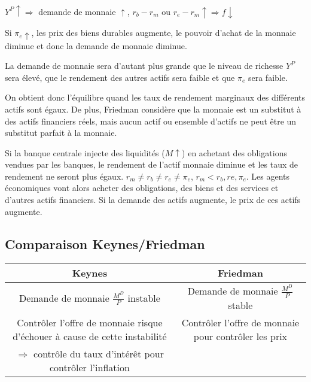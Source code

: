 	$Y^P \uparrow \Rightarrow$ demande de monnaie $\uparrow$, $r_b - r_m$ ou $r_e - r_m \uparrow \Rightarrow f \downarrow$
	
	Si $\pi_e \uparrow$, les prix des biens durables augmente, le pouvoir d'achat de la monnaie diminue et donc la demande de monnaie diminue.
	
	La demande de monnaie sera d'autant plus grande que le niveau de richesse $Y^P$ sera élevé, que le rendement des autres actifs sera faible et que $\pi_e$ sera faible. 
	
	On obtient donc l'équilibre quand les taux de rendement marginaux des différents actifs sont égaux. De plus, Friedman considère que la monnaie est un substitut à des actifs financiers réels, mais aucun actif ou ensemble d'actifs ne peut être un substitut parfait à la monnaie.
	
	Si la banque centrale injecte des liquidités ($M \uparrow$) en achetant des obligations vendues par les banques, le rendement de l'actif monnaie diminue et les taux de rendement ne seront plus égaux. $r_m \neq r_b \neq r_e \neq \pi_e$, $r_m < r_b, re, \pi_e$. Les agents économiques vont alors acheter des obligations, des biens et des services et d'autres actifs financiers. Si la demande des actifs augmente, le prix de ces actifs augmente.

	\subsection{Comparaison Keynes/Friedman}
	
	\begin{tabular}{|c|c|}
	\hline 
	Keynes & Friedman \\ 
	\hline 
	Demande de monnaie $\frac{M^D}{P}$ instable & Demande de monnaie $\frac{M^D}{P}$ stable \\ 
	\hline 
	Contrôler l'offre de monnaie risque d'échouer à cause de cette instabilité & Contrôler l'offre de monnaie pour contrôler les prix \\ 
	\hline 
	$\Rightarrow$ contrôle du taux d'intérêt pour contrôler l'inflation &  \\ 
	\hline 
	\end{tabular} 
